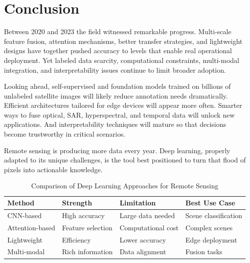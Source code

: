 \documentclass[12pt,a4paper]{article}
\begin{document}
\section{Conclusion}
\label{sec:conclusion}

Between 2020 and 2023 the field witnessed remarkable progress. Multi-scale feature fusion, attention mechanisms, better transfer strategies, and lightweight designs have together pushed accuracy to levels that enable real operational deployment. Yet labeled data scarcity, computational constraints, multi-modal integration, and interpretability issues continue to limit broader adoption.

Looking ahead, self-supervised and foundation models trained on billions of unlabeled satellite images will likely reduce annotation needs dramatically. Efficient architectures tailored for edge devices will appear more often. Smarter ways to fuse optical, SAR, hyperspectral, and temporal data will unlock new applications. And interpretability techniques will mature so that decisions become trustworthy in critical scenarios.

Remote sensing is producing more data every year. Deep learning, properly adapted to its unique challenges, is the tool best positioned to turn that flood of pixels into actionable knowledge.

\begin{table}[htbp]
\centering
\caption{Comparison of Deep Learning Approaches for Remote Sensing}
\label{tab:comparison}
\begin{tabular}{@{}llll@{}}
\toprule
\textbf{Method}       & \textbf{Strength}         & \textbf{Limitation}       & \textbf{Best Use Case}   \\
\midrule
CNN-based             & High accuracy             & Large data needed         & Scene classification    \\
Attention-based       & Feature selection         & Computational cost        & Complex scenes           \\
Lightweight           & Efficiency                & Lower accuracy            & Edge deployment          \\
Multi-modal           & Rich information         & Data alignment            & Fusion tasks             \\
\bottomrule
\end{tabular}
\end{table}
\end{document}
